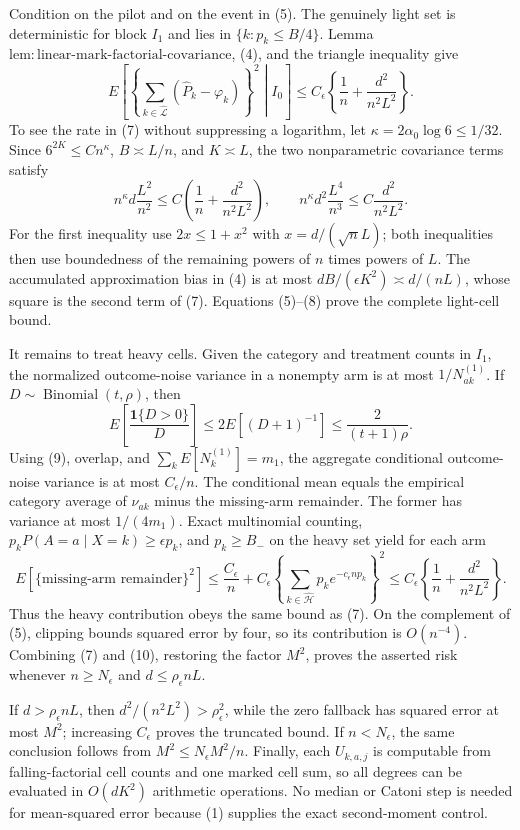 Condition on the pilot and on the event in (5).  The genuinely light set is deterministic for block \(I_1\) and lies in \(\{k:p_k\le B/4\}\).  Lemma~\(\mathrm{lem:linear\text{-}mark\text{-}factorial\text{-}covariance}\), (4), and the triangle inequality give
\[
 E\left[\left\{\sum_{k\in\widehat{\mathcal L}}(\widehat P_k-\varphi_k)\right\}^2
 \middle| I_0\right]
 \le C_{\epsilon}\left\{\frac1n+\frac{d^2}{n^2L^2}\right\}.
\tag{7}
\]
To see the rate in (7) without suppressing a logarithm, let \(\kappa=2\alpha_0\log6\le1/32\).  Since \(6^{2K}\le Cn^{\kappa}\), \(B\asymp L/n\), and \(K\asymp L\), the two nonparametric covariance terms satisfy
\[
 n^{\kappa}d\frac{L^2}{n^2}
 \le C\left(\frac1n+\frac{d^2}{n^2L^2}\right),\qquad
 n^{\kappa}d^2\frac{L^4}{n^3}
 \le C\frac{d^2}{n^2L^2}.
\tag{8}
\]
For the first inequality use \(2x\le1+x^2\) with \(x=d/(\sqrt nL)\); both inequalities then use boundedness of the remaining powers of \(n\) times powers of \(L\).  The accumulated approximation bias in (4) is at most \(dB/(\epsilon K^2)\asymp d/(nL)\), whose square is the second term of (7).  Equations (5)--(8) prove the complete light-cell bound.

It remains to treat heavy cells.  Given the category and treatment counts in \(I_1\), the normalized outcome-noise variance in a nonempty arm is at most \(1/N_{ak}^{(1)}\).  If \(D\sim\operatorname{Binomial}(t,\rho)\), then
\[
 E\left[\frac{\mathbf 1\{D>0\}}D\right]
 \le2E[(D+1)^{-1}]\le\frac{2}{(t+1)\rho}.
\tag{9}
\]
Using (9), overlap, and \(\sum_kE[N_k^{(1)}]=m_1\), the aggregate conditional outcome-noise variance is at most \(C_{\epsilon}/n\).  The conditional mean equals the empirical category average of \(\nu_{ak}\) minus the missing-arm remainder.  The former has variance at most \(1/(4m_1)\).  Exact multinomial counting, \(p_kP(A=a\mid X=k)\ge\epsilon p_k\), and \(p_k\ge B_-\) on the heavy set yield for each arm
\[
 E[\{\text{missing-arm remainder}\}^2]
 \le\frac{C_{\epsilon}}n+C_{\epsilon}\left\{
 \sum_{k\in\widehat{\mathcal H}}p_ke^{-c_{\epsilon}np_k}\right\}^2
 \le C_{\epsilon}\left\{\frac1n+\frac{d^2}{n^2L^2}\right\}.
\tag{10}
\]
Thus the heavy contribution obeys the same bound as (7).  On the complement of (5), clipping bounds squared error by four, so its contribution is \(O(n^{-4})\).  Combining (7) and (10), restoring the factor \(M^2\), proves the asserted risk whenever \(n\ge N_{\epsilon}\) and \(d\le\rho_{\epsilon}nL\).

If \(d>\rho_{\epsilon}nL\), then \(d^2/(n^2L^2)>\rho_{\epsilon}^2\), while the zero fallback has squared error at most \(M^2\); increasing \(C_{\epsilon}\) proves the truncated bound.  If \(n<N_{\epsilon}\), the same conclusion follows from \(M^2\le N_{\epsilon}M^2/n\).  Finally, each \(U_{k,a,j}\) is computable from falling-factorial cell counts and one marked cell sum, so all degrees can be evaluated in \(O(dK^2)\) arithmetic operations.  No median or Catoni step is needed for mean-squared error because (1) supplies the exact second-moment control.
